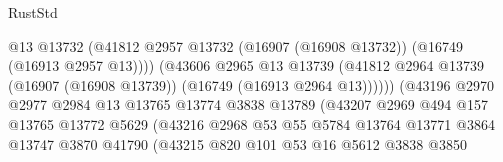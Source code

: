 \begin{lexlean}{RustStd}
\begin{coremodule}
                                            @13
                                            @13732
                                            (@41812
                                              @2957
                                              @13732
                                              (@16907 (@16908 @13732))
                                              (@16749 (@16913 @2957 @13))))
                                          (@43606
                                            @2965
                                            @13
                                            @13739
                                            (@41812
                                              @2964
                                              @13739
                                              (@16907 (@16908 @13739))
                                              (@16749 (@16913 @2964 @13))))))
                                      (@43196
                                        @2970
                                        @2977
                                        @2984
                                        @13
                                        @13765
                                        @13774
                                        @3838
                                        @13789
                                        (@43207
                                          @2969
                                          @494
                                          @157
                                          @13765
                                          @13772
                                          @5629
                                          (@43216
                                            @2968
                                            @53
                                            @55
                                            @5784
                                            @13764
                                            @13771
                                            @3864
                                            @13747
                                            @3870
                                            @41790
                                            (@43215
                                              @820
                                              @101
                                              @53
                                              @16
                                              @5612
                                              @3838
                                              @3850

\end{coremodule}
\end{lexlean}
